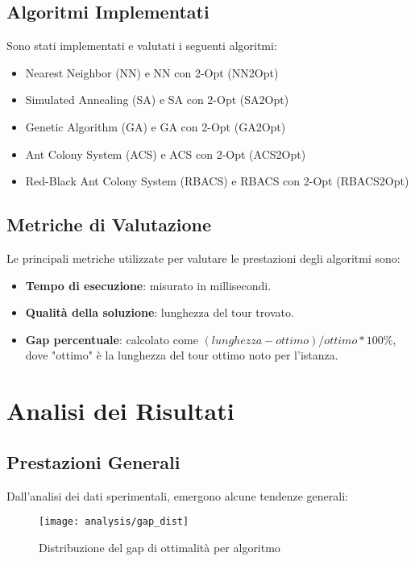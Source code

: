 \subsection{Algoritmi Implementati}
Sono stati implementati e valutati i seguenti algoritmi:

\begin{itemize}
	\item Nearest Neighbor (NN) e NN con 2-Opt (NN2Opt)
	\item Simulated Annealing (SA) e SA con 2-Opt (SA2Opt)
	\item Genetic Algorithm (GA) e GA con 2-Opt (GA2Opt)
	\item Ant Colony System (ACS) e ACS con 2-Opt (ACS2Opt)
	\item Red-Black Ant Colony System (RBACS) e RBACS con 2-Opt (RBACS2Opt)
\end{itemize}

\subsection{Metriche di Valutazione}
Le principali metriche utilizzate per valutare le prestazioni degli algoritmi sono:

\begin{itemize}
	\item \textbf{Tempo di esecuzione}: misurato in millisecondi.
	\item \textbf{Qualità della soluzione}: lunghezza del tour trovato.
	\item \textbf{Gap percentuale}: calcolato come $(lunghezza - ottimo) / ottimo * 100\%$, dove "ottimo" è la lunghezza del tour ottimo noto per l'istanza.
\end{itemize}

\section{Analisi dei Risultati}
\label{sec:analisi}

\subsection{Prestazioni Generali}
Dall'analisi dei dati sperimentali, emergono alcune tendenze generali:

\begin{figure}
	\begin{center}
		\texttt{[image: analysis/gap\_dist]}
	\end{center}
	\caption{Distribuzione del gap di ottimalità per algoritmo}\label{fig:}
\end{figure}


